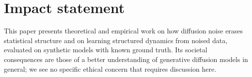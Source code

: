 \documentclass{article}
\theoremstyle{plain}
\theoremstyle{definition}
\theoremstyle{remark}
\begin{document}

\printAffiliationsAndNotice{}

\begin{abstract}

\end{abstract}









\section*{Impact statement}
This paper presents theoretical and empirical work on how diffusion noise erases
statistical structure and on learning structured dynamics from noised data, evaluated on
synthetic models with known ground truth. Its societal consequences are those of a better
understanding of generative diffusion models in general; we see no specific ethical
concern that requires discussion here.




\newpage
\appendix
\onecolumn





\end{document}
